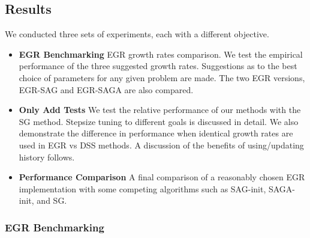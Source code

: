 \documentclass[11pt]{article}
\begin{document}



   
  
   
   \subsection{Results}

   We conducted three sets of experiments, each with a different objective. 
   \begin{itemize}
    \item \textbf{EGR Benchmarking} EGR growth rates comparison. We test the empirical performance of the three suggested growth rates. Suggestions as to the best choice of parameters for any given problem are made. The two EGR versions, EGR-SAG and EGR-SAGA are also compared. 
    \item \textbf{Only Add Tests} We test the relative performance of our methods with the SG method. Stepsize tuning to different goals is discussed in detail. We also demonstrate the difference in performance when identical growth rates are used in EGR vs DSS methods. A discussion of the benefits of using/updating history follows. 
   	\item \textbf{Performance Comparison} A final comparison of a reasonably chosen EGR implementation with some competing algorithms such as SAG-init, SAGA-init, and SG.
   \end{itemize}

   
   \subsubsection{EGR Benchmarking}
   
\end{document}
